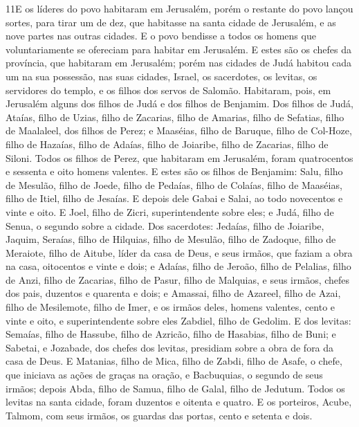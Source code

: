 \lettrine{11} E os líderes do povo habitaram em Jerusalém,
porém o restante do povo lançou sortes, para tirar um de dez, que
habitasse na santa cidade de Jerusalém, e as nove partes nas outras
cidades. E o povo bendisse a todos os homens que voluntariamente
se ofereciam para habitar em Jerusalém. E estes são os chefes da
província, que habitaram em Jerusalém; porém nas cidades de Judá
habitou cada um na sua possessão, nas suas cidades, Israel, os
sacerdotes, os levitas, os servidores do templo, e os filhos dos
servos de Salomão. Habitaram, pois, em Jerusalém alguns dos
filhos de Judá e dos filhos de Benjamim. Dos filhos de Judá, Ataías,
filho de Uzias, filho de Zacarias, filho de Amarias, filho de
Sefatias, filho de Maalaleel, dos filhos de Perez; e Maaséias,
filho de Baruque, filho de Col-Hoze, filho de Hazaías, filho de
Adaías, filho de Joiaribe, filho de Zacarias, filho de Siloni.
Todos os filhos de Perez, que habitaram em Jerusalém, foram
quatrocentos e sessenta e oito homens valentes. E estes são os
filhos de Benjamim: Salu, filho de Mesulão, filho de Joede, filho de
Pedaías, filho de Colaías, filho de Maaséias, filho de Itiel, filho
de Jesaías. E depois dele Gabai e Salai, ao todo novecentos e
vinte e oito. E Joel, filho de Zicri, superintendente sobre
eles; e Judá, filho de Senua, o segundo sobre a cidade. Dos
sacerdotes: Jedaías, filho de Joiaribe, Jaquim, Seraías,
filho de Hilquias, filho de Mesulão, filho de Zadoque, filho de
Meraiote, filho de Aitube, líder da casa de Deus, e seus
irmãos, que faziam a obra na casa, oitocentos e vinte e dois; e
Adaías, filho de Jeroão, filho de Pelalias, filho de Anzi, filho de
Zacarias, filho de Pasur, filho de Malquias, e seus irmãos,
chefes dos pais, duzentos e quarenta e dois; e Amassai, filho de
Azareel, filho de Azai, filho de Mesilemote, filho de Imer, e
os irmãos deles, homens valentes, cento e vinte e oito, e
superintendente sobre eles Zabdiel, filho de Gedolim. E dos
levitas: Semaías, filho de Hassube, filho de Azricão, filho de
Hasabias, filho de Buni; e Sabetai, e Jozabade, dos chefes
dos levitas, presidiam sobre a obra de fora da casa de Deus.
E Matanias, filho de Mica, filho de Zabdi, filho de Asafe, o
chefe, que iniciava as ações de graças na oração, e Bacbuquias, o
segundo de seus irmãos; depois Abda, filho de Samua, filho de Galal,
filho de Jedutum. Todos os levitas na santa cidade, foram
duzentos e oitenta e quatro. E os porteiros, Acube, Talmom,
com seus irmãos, os guardas das portas, cento e setenta e dois.

